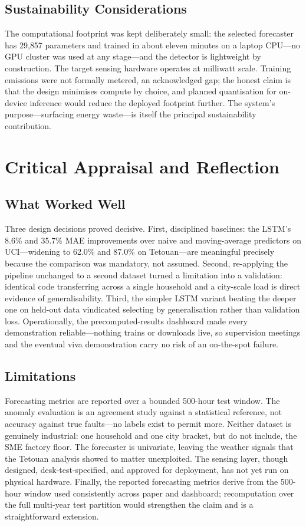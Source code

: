 \documentclass[11pt,a4paper]{article}
\begin{document}
\subsection{Sustainability Considerations}
The computational footprint was kept deliberately small: the selected forecaster
has 29{,}857 parameters and trained in about eleven minutes on a laptop
CPU---no GPU cluster was used at any stage---and the detector is lightweight by
construction. The target sensing hardware operates at milliwatt scale. Training
emissions were not formally metered, an acknowledged gap; the honest claim is
that the design minimises compute by choice, and planned quantisation for
on-device inference would reduce the deployed footprint further. The system's
purpose---surfacing energy waste---is itself the principal sustainability
contribution.

\section{Critical Appraisal and Reflection}

\subsection{What Worked Well}
Three design decisions proved decisive. First, disciplined baselines: the
LSTM's 8.6\% and 35.7\% MAE improvements over naive and moving-average
predictors on UCI---widening to 62.0\% and 87.0\% on Tetouan---are meaningful
precisely because the comparison was mandatory, not assumed. Second,
re-applying the pipeline unchanged to a second dataset turned a limitation into
a validation: identical code transferring across a single household and a
city-scale load is direct evidence of generalisability. Third, the simpler LSTM
variant beating the deeper one on held-out data vindicated selecting by
generalisation rather than validation loss. Operationally, the
precomputed-results dashboard made every demonstration reliable---nothing
trains or downloads live, so supervision meetings and the eventual viva
demonstration carry no risk of an on-the-spot failure.

\subsection{Limitations}
Forecasting metrics are reported over a bounded 500-hour test window. The
anomaly evaluation is an agreement study against a statistical reference, not
accuracy against true faults---no labels exist to permit more. Neither dataset
is genuinely industrial: one household and one city bracket, but do not include,
the SME factory floor. The forecaster is univariate, leaving the weather signals
that the Tetouan analysis showed to matter unexploited. The sensing layer,
though designed, desk-test-specified, and approved for deployment, has not yet
run on physical hardware. Finally, the reported forecasting metrics derive from
the 500-hour window used consistently across paper and dashboard; recomputation
over the full multi-year test partition would strengthen the claim and is a
straightforward extension.
\end{document}
